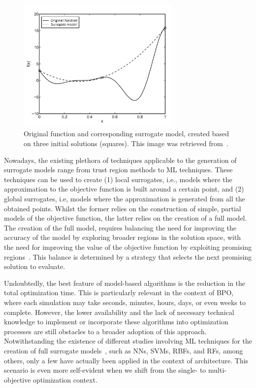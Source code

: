 	\begin{figure}
		\centering
		\includegraphics[width=8cm]{Images/Background/sbosexample.JPG}
		\caption[Example of a surrogate model]{Original function and corresponding surrogate model, created based on three initial solutions (squares). This image was retrieved from~\cite{Koziel2011}.}
		\label{fig:sbosexample}
	\end{figure}
	
	Nowadays, the existing plethora of techniques applicable to the generation of surrogate models range from trust region methods to \ac{ML} techniques. These techniques can be used to create (1) local surrogates, i.e., models where the approximation to the objective function is built around a certain point, and (2) global surrogates, i.e, models where the approximation is generated from all the obtained points. Whilst the former relies on the construction of simple, partial models of the objective function, the latter relies on the creation of a full model. The creation of the full model, requires balancing the need for improving the accuracy of the model by exploring broader regions in the solution space, with the need for improving the value of the objective function by exploiting promising regions~\cite{Koziel2011}. This balance is determined by a strategy that selects the next promising solution to evaluate.
	
	Undoubtedly, the best feature of model-based algorithms is the reduction in the total optimization time. This is particularly relevant in the context of \ac{BPO}, where each simulation may take seconds, minutes, hours, days, or even weeks to complete. However, the lower availability and the lack of necessary technical knowledge to implement or incorporate these algorithms into optimization processes are still obstacles to a broader adoption of this approach. Notwithstanding the existence of different studies involving \ac{ML} techniques for the creation of full surrogate models~\cite{Koziel2011, Forrester2009SBO}, such as \acp{NN}, \acp{SVM}, \acp{RBF}, and \acp{RF}, among others, only a few have actually been applied in the context of architecture. This scenario is even more self-evident when we shift from the single- to multi-objective optimization context.
	

